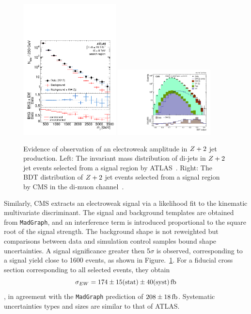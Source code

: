 \begin{figure}[p]
    \centering
    \includegraphics[width=0.45\textwidth]{figures/ss-exclboson-z2j-atlas8tev.pdf}
    \includegraphics[width=0.45\textwidth]{figures/ss-exclboson-z2j-cms8tev.pdf}
    \caption{Evidence of observation of an electroweak amplitude in $Z+2$ jet production.
    Left:  The invariant mass distribution of di-jets in $Z+2$ jet events selected
     from a signal region by ATLAS~\cite{Aad:2014dta}.
    Right:  The BDT distribution of $Z+2$ jet events selected from a signal region
    by CMS in the di-muon channel~\cite{Khachatryan:2014dea}.}
    \label{fig:ss-exclboson-z2j-8tev}
\end{figure}

Similarly, CMS extracts an electroweak signal via a likelihood fit to the kinematic multivariate discriminant.  The signal and background
templates are obtained from \texttt{MadGraph}, 
and an interference term is introduced proportional to the square root of the signal strength.
The background shape is not reweighted but comparisons between data and simulation control samples bound shape uncertainties.  A signal significance
greater then 5$\sigma$ is observed, corresponding to a signal yield close to 1600 events, as shown in Figure.~\ref{fig:ss-exclboson-z2j-8tev}.
For a fiducial cross section corresponding to all selected events, they obtain
$$\sigma_{EW} = 174 \pm 15 \rm{(stat)} \pm 40 \rm{(syst)} \rm{\,fb}$$,
in agreement with the \texttt{MadGraph} prediction of $208 \pm 18 \rm{\,fb}$.  Systematic uncertainties types and sizes are similar to that of ATLAS.
